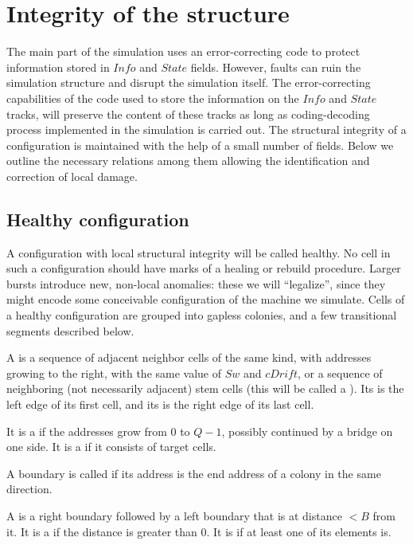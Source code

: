 \documentclass[12pt]{memoir}
\newcommand{\fld}[1]{\ensuremath{\textit{#1}}}
\def\B{B}
\newcommand{\cDrift}{\fld{cDrift}}
\newcommand{\Info}{\fld{Info}}
\newcommand{\State}{\fld{State}}
\newcommand{\Sweep}{\fld{Sw}}
\begin{document}
\section{Integrity of the structure}            \label{sec:integrity}

The main part of the simulation uses an error-correcting
code to protect information stored in \( \Info \) and \( \State \) fields.
However, faults can ruin the simulation structure and disrupt the simulation itself.
The error-correcting capabilities of the code 
used to store the information on the \( \Info \) and
\( \State \) tracks, will preserve the content of these tracks as long as coding-decoding
process implemented in the simulation is carried out.
The structural integrity of a configuration is maintained with the help of a small number
of fields.
Below we outline the necessary relations among them 
allowing the identification and correction of local damage.

\subsection{Healthy configuration}

A configuration with local structural integrity will be called healthy.
No cell in such a configuration should have marks of a healing or
rebuild procedure.
Larger bursts introduce new, non-local anomalies: 
these we will ``legalize'', since they might encode
some conceivable configuration of the machine we simulate.
Cells of a healthy configuration are grouped into gapless colonies, and 
a few transitional segments described below.

\begin{definition}[Segments]\label{def:segments}
    A  is a sequence of adjacent neighbor cells of the same kind,
with addresses growing to the right, with the same value of \( \Sweep \)
and \( \cDrift \),
or a sequence of neighboring (not necessarily adjacent) 
stem cells (this will be called a ).
Its  is the left edge of its first cell, and its  is 
the right edge of its last cell.

It is a  if the addresses grow from \( 0 \) to \( Q-1 \), possibly continued
by a bridge on one side.
It is a %
 if it consists of target cells.

A boundary is called  if its address is the end 
address of a colony in the same direction.

A  
is a right boundary followed by a left boundary that is at distance \( <\B \) from it.
It is a  if the distance is greater than 0.
It is  if at least one of its elements is.
\end{definition}
\end{document}
